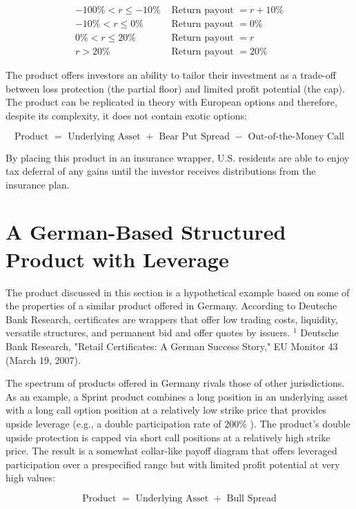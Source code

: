 \documentclass[11pt]{article}
\begin{document}
$$
\begin{array}{ll}
-100 \%<r \leq-10 \% & \text { Return payout }=r+10 \% \\
-10 \%<r \leq 0 \% & \text { Return payout }=0 \% \\
0 \%<r \leq 20 \% & \text { Return payout }=r \\
r>20 \% & \text { Return payout }=20 \%
\end{array}
$$

The product offers investors an ability to tailor their investment as a trade-off between loss protection (the partial floor) and limited profit potential (the cap). The product can be replicated in theory with European options and therefore, despite its complexity, it does not contain exotic options:

$$
\text { Product }=\text { Underlying Asset }+ \text { Bear Put Spread }- \text { Out-of-the-Money Call }
$$

By placing this product in an insurance wrapper, U.S. residents are able to enjoy tax deferral of any gains until the investor receives distributions from the insurance plan.

\section*{A German-Based Structured Product with Leverage}
The product discussed in this section is a hypothetical example based on some of the properties of a similar product offered in Germany. According to Deutsche Bank Research, certificates are wrappers that offer low trading costs, liquidity, versatile structures, and permanent bid and offer quotes by issuers. ${ }^{1}$ Deutsche Bank Research, "Retail Certificates: A German Success Story," EU Monitor 43 (March 19, 2007).

The spectrum of products offered in Germany rivals those of other jurisdictions. As an example, a Sprint product combines a long position in an underlying asset with a long call option position at a relatively low strike price that provides upside leverage (e.g., a double participation rate of $200 \%$ ). The product's double upside protection is capped via short call positions at a relatively high strike price. The result is a somewhat collar-like payoff diagram that offers leveraged participation over a prespecified range but with limited profit potential at very high values:

$$
\text { Product }=\text { Underlying Asset }+ \text { Bull Spread }
$$
\end{document}
